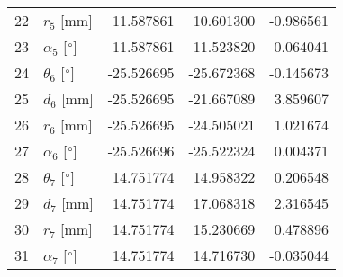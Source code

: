 \documentclass{standalone}%
\begin{document}
\begin{tabular}{llrrr}
22 &              $r_{5}$ [mm] &  11.587861 &  10.601300 &  -0.986561 \\
23 &  $\alpha_{5}$ [$\degree$] &  11.587861 &  11.523820 &  -0.064041 \\
24 &  $\theta_{6}$ [$\degree$] & -25.526695 & -25.672368 &  -0.145673 \\
25 &              $d_{6}$ [mm] & -25.526695 & -21.667089 &   3.859607 \\
26 &              $r_{6}$ [mm] & -25.526695 & -24.505021 &   1.021674 \\
27 &  $\alpha_{6}$ [$\degree$] & -25.526696 & -25.522324 &   0.004371 \\
28 &  $\theta_{7}$ [$\degree$] &  14.751774 &  14.958322 &   0.206548 \\
29 &              $d_{7}$ [mm] &  14.751774 &  17.068318 &   2.316545 \\
30 &              $r_{7}$ [mm] &  14.751774 &  15.230669 &   0.478896 \\
31 &  $\alpha_{7}$ [$\degree$] &  14.751774 &  14.716730 &  -0.035044 \\
\bottomrule
\end{tabular}
%
\end{document}
